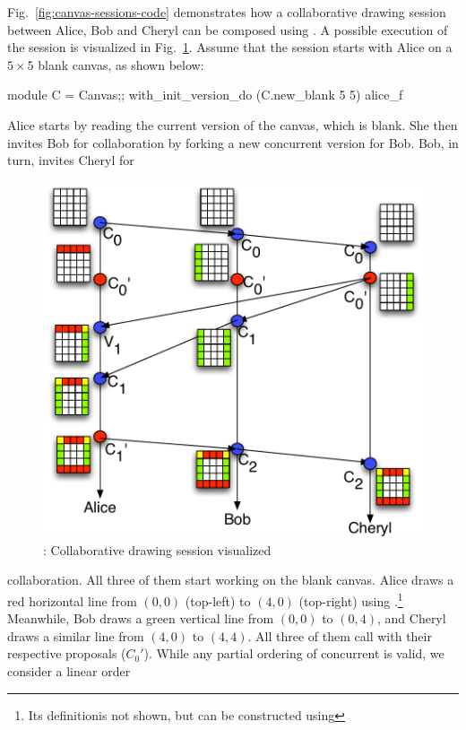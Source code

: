 Fig.~\ref{fig:canvas-sessions-code} demonstrates how a collaborative
drawing session between Alice, Bob and Cheryl can be composed using
\name. A possible execution of the session is visualized in
Fig.~\ref{fig:canvas-sessions}. Assume that the session starts with
Alice on a $5\times 5$ blank canvas, as shown below:
\begin{ocaml}
  module C = Canvas;; 
  with_init_version_do (C.new_blank 5 5) alice_f 
\end{ocaml}
Alice starts by reading the current version of the canvas, which is
blank. She then invites Bob for collaboration by forking a new
concurrent version for Bob. Bob, in turn, invites Cheryl for
\begin{figure}
\centering
\includegraphics[scale=0.6]{Figures/canvas-sessions}
\caption{\drawsome: Collaborative drawing session visualized}
\label{fig:canvas-sessions}
\end{figure}
collaboration. All three of them start working on the blank canvas.
Alice draws a red horizontal line from $(0,0)$ (top-left) to $(4,0)$
(top-right) using .\footnote{Its definitionis not
  shown, but can be constructed using } Meanwhile, Bob
draws a green vertical line from $(0,0)$ to $(0,4)$, and Cheryl draws
a similar line from $(4,0)$ to $(4,4)$. All three of them call
 with their respective proposals ($C_0'$). While any partial
ordering of concurrent  is valid, we consider a linear order
